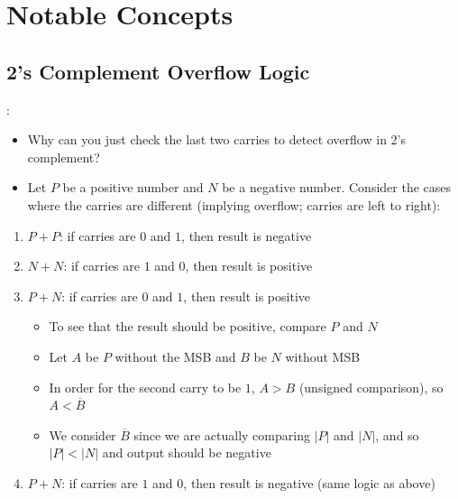\documentclass{../slides}
\begin{document}
\section{Notable Concepts}
\subsection{2's Complement Overflow Logic}
\begin{frame}{\secname: \subsecname}
    \begin{itemize}
        \item Why can you just check the last two carries to detect overflow in 2's complement?
        \item Let $P$ be a positive number and $N$ be a negative number. Consider the cases where the carries are different (implying overflow; carries are left to right):
    \end{itemize}
    \begin{enumerate}
        \item $P + P$: if carries are $0$ and $1$, then result is negative
        \item $N + N$: if carries are $1$ and $0$, then result is positive
        \item $P + N$: if carries are $0$ and $1$, then result is positive
        \begin{itemize}
            \item To see that the result should be positive, compare $P$ and $N$
            \item Let $A$ be $P$ without the MSB and $B$ be $N$ without MSB
            \item In order for the second carry to be $1$, $A > B$ (unsigned comparison), so $A < \overbar{B}$
            \item We consider $\overbar{B}$ since we are actually comparing $|P|$ and $|N|$, and so $|P| < |N|$ and output should be negative
        \end{itemize}
        \item $P + N$: if carries are $1$ and $0$, then result is negative (same logic as above)
    \end{enumerate}
\end{frame}
\end{document}
